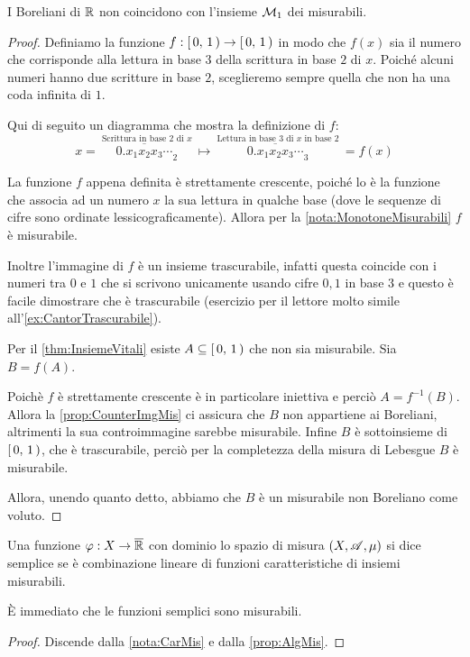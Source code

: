 \begin{proposition}\label{prop:BorelianiNonMisurabili2}
	I Boreliani di $\mathbb R$ non coincidono con l'insieme $\mathcal M_1$ dei misurabili.
\end{proposition}
\begin{proof}
	Definiamo la funzione $f:\left[\,0,\,1\,\right)\to \left[\,0,\,1\,\right)$ in modo che $f(x)$ sia il numero che corrisponde alla lettura in base $3$ della scrittura in base $2$ di $x$.
	Poiché alcuni numeri hanno due scritture in base $2$, sceglieremo sempre quella che non ha una coda infinita di $1$.
	
	Qui di seguito un diagramma che mostra la definizione di $f$:
	\begin{equation*}
		x=\>\stackrel{\text{Scrittura in base $2$ di $x$}}{\overline{0.x_1x_2x_3\cdots}_2} \>  \longmapsto
		\> \stackrel{\text{Lettura in base $3$ di $x$ in base $2$}}{\overline{0.x_1x_2x_3\cdots}_3}\>=f(x)
	\end{equation*}

	La funzione $f$ appena definita è strettamente crescente, poiché lo è la funzione che associa ad un numero $x$ la sua lettura in qualche base (dove le sequenze di cifre sono ordinate lessicograficamente). Allora per la \cref{nota:MonotoneMisurabili} $f$ è misurabile.
	
	Inoltre l'immagine di $f$ è un insieme trascurabile, infatti questa coincide con i numeri tra $0$ e $1$ che si scrivono unicamente usando cifre $0,1$ in base $3$ e questo è facile dimostrare che è trascurabile (esercizio per il lettore molto simile all'\cref{ex:CantorTrascurabile}).
	
	Per il \cref{thm:InsiemeVitali} esiste $A\subseteq \left[\,0,\,1\,\right)$ che non sia misurabile.
	Sia $B=f(A)$.
	
	Poichè $f$ è strettamente crescente è in particolare iniettiva e perciò $A=f^{-1}(B)$.
	Allora la \cref{prop:CounterImgMis} ci assicura che $B$ non appartiene ai Boreliani, altrimenti la sua controimmagine sarebbe misurabile. 
	Infine $B$ è sottoinsieme di $\left[\,0,\,1\,\right)$, che è trascurabile, perciò per la completezza della misura di Lebesgue $B$ è misurabile.
	
	Allora, unendo quanto detto, abbiamo che $B$ è un misurabile non Boreliano come voluto.
\end{proof}



\begin{definition}
	Una funzione $\varphi:X \rightarrow \overline{\mathbb R}$ con dominio lo spazio di misura $(X,\mathscr A,\mu)$ si dice semplice se è combinazione lineare di
	funzioni caratteristiche di insiemi misurabili.
\end{definition}
\begin{remark}
	È immediato che le funzioni semplici sono misurabili.
\end{remark}
\begin{proof}
	Discende dalla \cref{nota:CarMis} e dalla \cref{prop:AlgMis}.
\end{proof}


